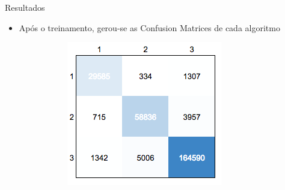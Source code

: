 \documentclass[final,hyperref={pdfpagelabels=false, brazil}]{beamer}
\let\olditem=\item%
\renewcommand{\item}{\olditem \justifying}%
\begin{document}
\begin{frame}[t]
\begin{columns}[t]
\begin{column}{.465\textwidth}
\begin{block}{Resultados}
\begin{itemize}



\begin{itemize}

\item Após o treinamento, gerou-se as Confusion Matrices de cada algoritmo

\begin{figure}[t!]
    \centering
        \caption{Confusion Matrices}
    \begin{subfigure}[t]{0.42\textwidth}
        \centering
\includegraphics[width=1\linewidth]{cm-rl.png}


\end{subfigure}
\end{figure}
\end{itemize}
\end{itemize}
\end{block}
\end{column}
\end{columns}
\end{frame}
\end{document}
